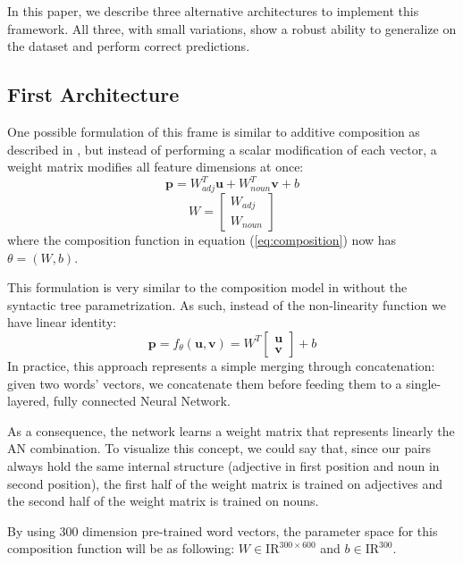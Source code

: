 In this paper, we describe  three alternative architectures to implement this framework. All three, with small variations, show a robust ability to generalize on the dataset and perform correct predictions.

\subsection{First Architecture}

One possible formulation of this frame is similar to additive composition as described in
\cite{mitchell2010composition}, but instead of performing a scalar modification of each vector, a weight matrix modifies all feature dimensions at once:
\begin{equation}
\mathbf{p} = W_{adj}^T\mathbf{u} + W_{noun}^T \mathbf{v}  + b
\end{equation}
\begin{equation}
W = \left[\begin{array}{l}
      W_{adj} \\
      W_{noun}
    \end{array}\right]
\end{equation}
where the composition function in equation (\ref{eq:composition}) now has $\theta = (W, b)$. 

This formulation is very similar to the composition model in \cite{socher2011semi} without the syntactic tree parametrization. As such, instead of the non-linearity function we have linear identity:
\begin{equation}
	\mathbf{p} = f_{\theta}(\mathbf{u}, \mathbf{v}) = W^T\left[\begin{array}{l}
		\mathbf{u}\\
		\mathbf{v}
	\end{array}\right] + b
\end{equation}
In practice, this approach represents a simple merging through concatenation: given two words' vectors, we concatenate them before feeding them to a single-layered, fully connected Neural Network.

As a consequence, the network learns a weight matrix that represents linearly the AN combination.
To visualize this concept, we could say that, since our pairs always hold the same internal structure (adjective in first position and noun in second position), the first half of the weight matrix is trained on adjectives and the second half of the weight matrix is trained on nouns. 

By using 300 dimension pre-trained word vectors, the parameter space for this composition function will be as following: $W \in \mathrm{I\!R}^{300 \times 600}$ and $b \in \mathrm{I\!R}^{300}$.

